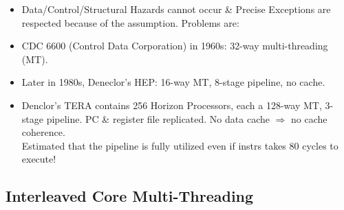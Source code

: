 \documentclass{beamer}
\newcommand{\emp}[1]{\textcolor{DikuRed}{ #1}}
\begin{document}
\begin{frame}[fragile,t]
\begin{scriptsize}
\begin{itemize}
\item Data/Control/Structural Hazards cannot occur \& Precise Exceptions are
        respected because of the \alert{assumption}.  \alert{Problems are}:
    \begin{itemize}\pause
    \end{itemize}
\pause
\item CDC 6600 (Control Data Corporation) in \alert{1960s}: 32-way multi-threading (MT).
\item Later in 1980s, Deneclor's HEP: 16-way MT, 8-stage pipeline,  no cache.
\item Denclor's TERA contains 256 Horizon Processors, each a 128-way MT, 3-stage pipeline. 
        PC \& register file replicated.
        No data cache $\Rightarrow$ no cache coherence.\\\emp{Estimated that the pipeline
        is fully utilized even if instrs takes 80 cycles to execute!}
\end{itemize} 
\end{scriptsize}

\end{frame}


\subsection{Interleaved Core Multi-Threading}
\end{document}
